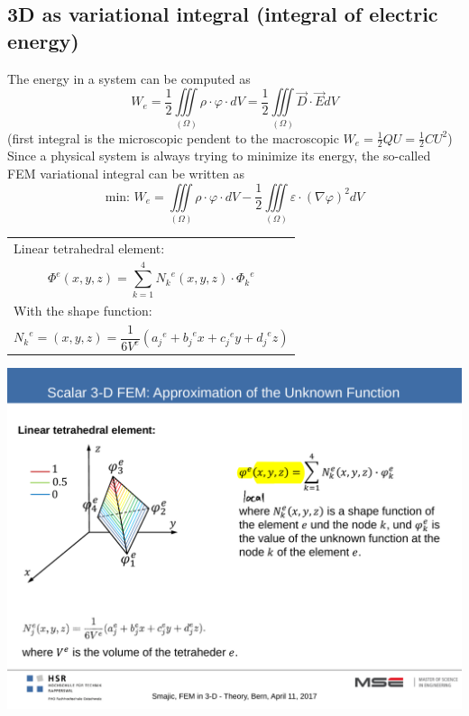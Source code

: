 \subsection{3D as variational integral (integral of electric energy)}
The energy in a system can be computed as
\begin{equation*}
	W_e = \frac{1}{2} \iiint\limits_{\left(\Omega\right)} \rho \cdot \varphi \cdot dV = \frac{1}{2} \iiint\limits_{\left(\Omega	\right)} \vec{D} \cdot \vec{E} dV
\end{equation*}
(first integral is the microscopic pendent to the macroscopic $W_e = \frac{1}{2} QU = \frac{1}{2}CU^2$) \newline
Since a physical system is always trying to minimize its energy, the so-called FEM variational integral can be written as
\begin{equation*}
	\textrm{min: } W_e = \iiint\limits_{\left(\Omega\right)} \rho \cdot \varphi \cdot dV - \frac{1}{2} \iiint\limits_{\left(\Omega\right)} \varepsilon \cdot \left(\nabla \varphi\right)^2 dV
\end{equation*}

\begin{minipage}[rt]{12cm}
	\begin{tabular}{l}
		Linear tetrahedral element: \\
		\begin{equation*}
			\Phi^e(x,y,z) = \sum_{k=1}^{4}{N_k}^e(x,y,z) \cdot {\Phi_k}^e
		\end{equation*} \\
		With the shape function: \\
		\begin{equation*}
			{N_k}^e = (x,y,z) = \frac{1}{6 V^e}\left({a_j}^e + {b_j}^e x + {c_j}^e y + {d_j}^e z\right)
		\end{equation*}
	\end{tabular}
\end{minipage}
\begin{minipage}[lt]{8cm}
	\includegraphics[width=.6\textwidth]{./images/tetraheder.pdf}\\
\end{minipage}

